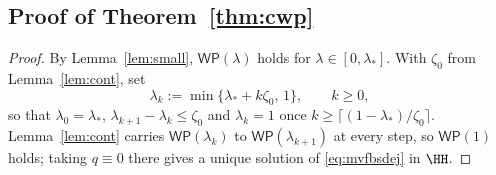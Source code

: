 \subsection{Proof of Theorem~\texorpdfstring{\ref{thm:cwp}}{3.5}}\label{sub:proofcwp}

\begin{proof}
By Lemma~\ref{lem:small}, $\mathsf{WP}(\lambda)$ holds for $\lambda\in[0,\lambda_*]$. With
$\zeta_0$ from Lemma~\ref{lem:cont}, set
\[
\lambda_k:=\min\{\lambda_*+k\zeta_0,\,1\},\qquad k\ge0 ,
\]
so that $\lambda_0=\lambda_*$, $\lambda_{k+1}-\lambda_k\le\zeta_0$ and $\lambda_k=1$ once
$k\ge\lceil(1-\lambda_*)/\zeta_0\rceil$. Lemma~\ref{lem:cont} carries
$\mathsf{WP}(\lambda_k)$ to $\mathsf{WP}(\lambda_{k+1})$ at every step, so
$\mathsf{WP}(1)$ holds; taking $q\equiv0$ there gives a unique solution of
\eqref{eq:mvfbsdej} in $\HH$.
\end{proof}

